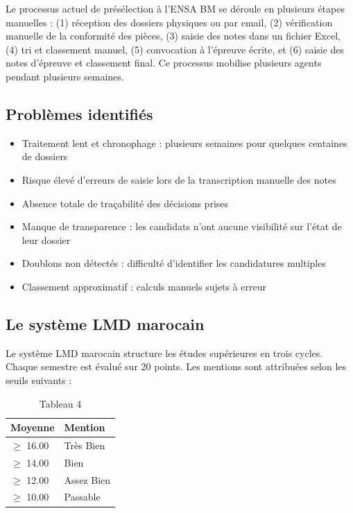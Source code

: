 Le processus actuel de présélection à l'ENSA BM se déroule en plusieurs étapes manuelles : (1) réception des dossiers physiques ou par email, (2) vérification manuelle de la conformité des pièces, (3) saisie des notes dans un fichier Excel, (4) tri et classement manuel, (5) convocation à l'épreuve écrite, et (6) saisie des notes d'épreuve et classement final. Ce processus mobilise plusieurs agents pendant plusieurs semaines.

\subsection{Problèmes identifiés}

\begin{itemize}
\item Traitement lent et chronophage : plusieurs semaines pour quelques centaines de dossiers
\item Risque élevé d'erreurs de saisie lors de la transcription manuelle des notes
\item Absence totale de traçabilité des décisions prises
\item Manque de transparence : les candidats n'ont aucune visibilité sur l'état de leur dossier
\item Doublons non détectés : difficulté d'identifier les candidatures multiples
\item Classement approximatif : calculs manuels sujets à erreur
\end{itemize}

\subsection{Le système LMD marocain}

Le système LMD marocain structure les études supérieures en trois cycles. Chaque semestre est évalué sur 20 points. Les mentions sont attribuées selon les seuils suivants :

\begin{table}[htbp]
\centering
\begin{tabular}{|l|l|}
\hline
Moyenne & Mention \\
\hline
$\geq$ 16.00 & Très Bien \\
\hline
$\geq$ 14.00 & Bien \\
\hline
$\geq$ 12.00 & Assez Bien \\
\hline
$\geq$ 10.00 & Passable \\
\hline
\end{tabular}
\caption{Tableau 4}
\label{tab:table_4}
\end{table}


